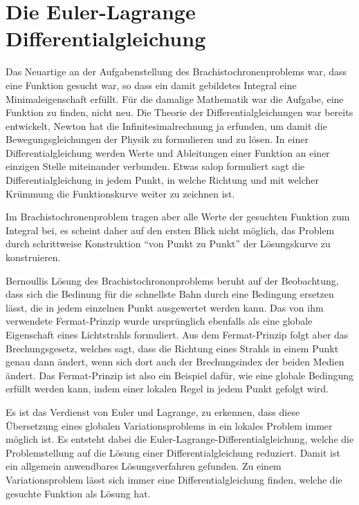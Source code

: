 %
%
%
\section{Die Euler-Lagrange Differentialgleichung
\label{buch:variation:section:eulerlagrange}}
Das Neuartige an der Aufgabenstellung des Brachistochronenproblems
war, dass eine Funktion gesucht war, so dass ein damit gebildetes
Integral eine Minimaleigenschaft erfüllt.
Für die damalige Mathematik war die Aufgabe, eine Funktion zu finden,
nicht neu.
Die Theorie der Differentialgleichungen war bereits entwickelt,
Newton hat die Infinitesimalrechnung ja erfunden, um damit die
Bewegungsgleichungen der Physik zu formulieren und zu lösen.
In einer Differentialgleichung werden Werte und Ableitungen einer
Funktion an einer einzigen Stelle miteinander verbunden.
Etwas salop formuliert sagt die Differentialgleichung in jedem
Punkt, in welche Richtung und mit welcher Krümmung die Funktionskurve
weiter zu zeichnen ist.

Im Brachistochronenproblem tragen aber alle Werte der gesuchten
Funktion zum Integral bei, es scheint daher auf den ersten Blick
nicht möglich, das Problem durch schrittweise Konstruktion
``von Punkt zu Punkt'' der Lösungskurve zu konstruieren.

Bernoullis Lösung des Brachistochrononproblems beruht auf der
Beobachtung, dass sich die Bedinung für die schnellste Bahn
durch eine Bedingung ersetzen lässt, die in jedem einzelnen
Punkt ausgewertet werden kann.
Das von ihm verwendete Fermat-Prinzip wurde ursprünglich ebenfalls
als eine globale Eigenschaft eines Lichtstrahls formuliert.
Aus dem Fermat-Prinzip folgt aber das Brechungsgesetz, welches
sagt, dass die Richtung eines Strahls in einem Punkt genau dann
ändert, wenn sich dort auch der Brechungsindex der beiden Medien
ändert.
Das Fermat-Prinzip ist also ein Beispiel dafür, wie eine globale
Bedingung erfüllt werden kann, indem einer lokalen Regel in jedem
Punkt gefolgt wird.

Es ist das Verdienst von Euler und Lagrange, zu erkennen, dass diese
Übersetzung eines globalen Variationsproblems in ein lokales 
Problem immer möglich ist.
Es entsteht dabei die Euler-Lagrange-Differentialgleichung, welche
die Problemstellung auf die Lösung einer Differentialgleichung
reduziert.
Damit ist ein allgemein anwendbares Lösungsverfahren gefunden.
Zu einem Variationsproblem lässt sich immer eine Differentialgleichung
finden, welche die gesuchte Funktion als Lösung hat.

